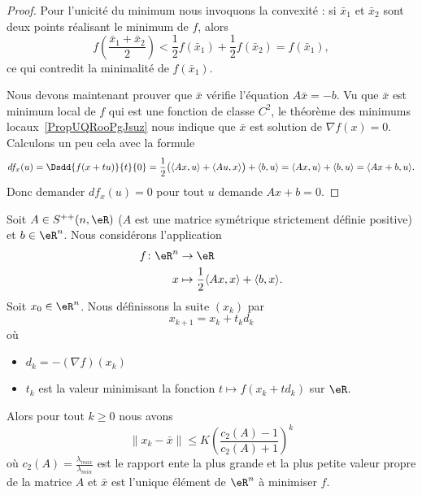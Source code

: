 \begin{proof}
	Pour l'unicité du minimum nous invoquons la convexité : si \( \bar x_1\) et \( \bar x_2\) sont deux points réalisant le minimum de \( f\), alors
	\begin{equation}
		f\left( \frac{ \bar x_1+\bar x_2 }{2} \right)<\frac{ 1 }{2}f(\bar x_1)+\frac{ 1 }{2}f(\bar x_2)=f(\bar x_1),
	\end{equation}
	ce qui contredit la minimalité de \( f(\bar x_1)\).

	Nous devons maintenant prouver que \( \bar x\) vérifie l'équation \( A\bar x=-b\). Vu que \( \bar x\) est minimum local de \( f\) qui est une fonction de classe \( C^2\), le théorème des minimums locaux~\ref{PropUQRooPgJsuz} nous indique que \( \bar x\) est solution de \( \nabla f(x)=0\). Calculons un peu cela avec la formule
	\begin{equation}
		df_x(u)=\Dsdd{ f(x+tu) }{t}{0}=\frac{ 1 }{2}\big( \langle Ax, u\rangle +\langle Au, x\rangle  \big)+\langle b, u\rangle =\langle Ax, u\rangle +\langle b, u\rangle =\langle Ax+b, u\rangle .
	\end{equation}
	Donc demander \( df_x(u)=0\) pour tout \( u\) demande \( Ax+b=0\).
\end{proof}

\begin{proposition} \label{PropSOOooGoMOxG}
	Soit \( A\in S^{++}(n,\eR)\) (\( A\) est une matrice symétrique strictement définie positive) et \( b\in \eR^n\). Nous considérons l'application
	\begin{equation}
		\begin{aligned}
			f\colon \eR^n & \to \eR                                                          \\
			x             & \mapsto \frac{ 1 }{2}\langle Ax, x\rangle +\langle b, x\rangle .
		\end{aligned}
	\end{equation}
	Soit \( x_0\in \eR^n\). Nous définissons la suite \( (x_k)\) par
	\begin{equation}
		x_{k+1}=x_k+t_kd_k
	\end{equation}
	où
	\begin{itemize}
		\item
		      \( d_k=-(\nabla f)(x_k)\)
		\item
		      \( t_k\) est la valeur minimisant la fonction \( t\mapsto f(x_k+td_k)\) sur \( \eR\).
	\end{itemize}

	Alors pour tout \( k\geq 0\) nous avons
	\begin{equation}
		\| x_k-\bar x \|\leq K \left( \frac{ c_2(A)-1 }{ c_2(A)+1 } \right)^k
	\end{equation}
	où \( c_2(A)=\frac{ \lambda_{max} }{ \lambda_{min} }\) est le rapport ente la plus grande et la plus petite valeur propre de la matrice \( A\) et \( \bar x\) est l'unique élément de \( \eR^n\) à minimiser \( f\).
\end{proposition}

